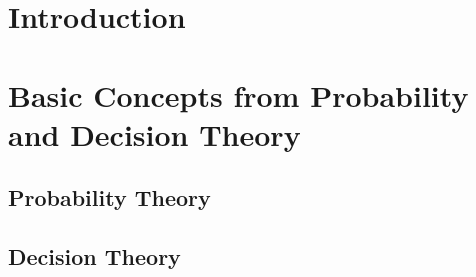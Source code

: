 \documentclass[a4paper]{scrreprt}
\begin{document}
    \tableofcontents
    
    \chapter{Introduction}
    
    \chapter{Basic Concepts from Probability and Decision Theory}
    
    \section{Probability Theory}
    
    \section{Decision Theory}
    
    
\end{document}
